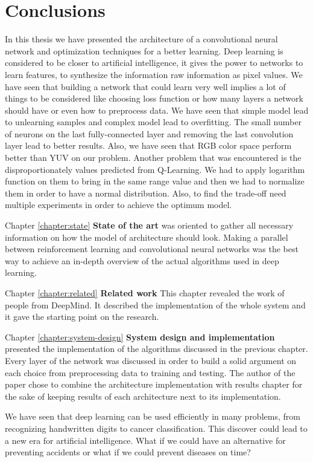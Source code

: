 \chapter{Conclusions}
\label{chapter:conclusions}

In this thesis we have presented the architecture of a convolutional neural network and optimization techniques for a better learning. Deep learning is considered to be closer to artificial intelligence, it gives the power to networks to learn features, to synthesize the information raw information as pixel values. We have seen that building a network that could learn very well implies a lot of things to be considered like choosing loss function or how many layers a network should have or even how to preprocess data. We have seen that simple model lead to unlearning samples and complex model lead to overfitting. The small number of neurons on the last fully-connected layer and removing the last convolution layer lead to better results. Also, we have seen that RGB color space perform better than YUV on our problem. Another problem that was encountered is the disproportionately values predicted from Q-Learning. We had to apply logarithm function on them to bring in the same range value and then we had to normalize them in order to have a normal distribution. Also, to find the trade-off need multiple experiments in order to achieve the optimum model.

Chapter \ref{chapter:state} \textbf{State of the art} was oriented to gather all necessary information on how the model of architecture should look. Making a parallel between reinforcement learning and convolutional neural networks was the best way to achieve an in-depth overview of the actual algorithms used in deep learning.

Chapter \ref{chapter:related} \textbf{Related work} This chapter revealed the work of people from DeepMind. It described the implementation of the whole system and it gave the starting point on the research.

Chapter \ref{chapter:system-design} \textbf{System design and implementation} presented the implementation of the algorithms discussed in the previous chapter. Every layer of the network was discussed in order to build a solid argument on each choice from preprocessing data to training and testing. The author of the paper chose to combine the architecture implementation with results chapter for the sake of keeping results of each architecture next to its implementation.

We have seen that deep learning can be used efficiently in many problems, from recognizing handwritten digits to cancer classification. This discover could lead to a new era for artificial intelligence. What if we could have an alternative for preventing accidents or what if we could prevent diseases on time?
